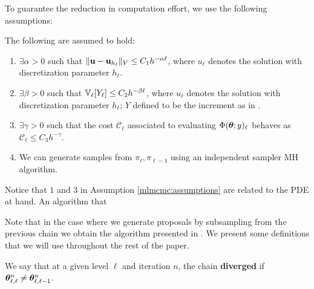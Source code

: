 To guarantee the reduction in computation effort, we use the following assumptions:
\begin{assumption}\label{mlmcmc:assumptions}The following are assumed to hold:
	\begin{enumerate}
		\item $\exists \alpha>0$ such that $\Vert \mathbf{u}-\mathbf{u}_{h_\ell}\Vert_V\leq C_1h^{-\alpha \ell}$, where $u_\ell$ denotes the solution with discretization parameter $h_\ell$.
		\item $\exists \beta>0$ such that $\mathbb{V}_\ell[ Y_\ell] \leq C_2h^{-\beta \ell}$, where $u_\ell$ denotes the solution with discretization parameter $h_\ell$; $Y$ defined to be the increment as in \cite{dodwell2015hierarchical}.
		\item $\exists \gamma>0$ such that the cost $\mathcal{C}_\ell$ associated to evaluating $\Phi(\bm{\theta};y)_\ell$ behaves as $\mathcal{C}_{\ell}\leq C_3h^{-\gamma}$.
		\item We can generate samples from $\pi_\ell, \pi_{\ell-1}$ using an independent sampler MH algorithm.
	\end{enumerate}
\end{assumption}
\begin{center}
	Notice that $1$ and $3$ in Assumption \ref{mlmcmc:assumptions} are related to the PDE at hand. An algorithm that 
\end{center}
Note that in the case where we generate proposals by subsampling from the previous chain we obtain the algorithm presented in \cite{dodwell2015hierarchical}. We present some definitions that we will use throughout the rest of the paper.
\begin{definition}
	We say that at a given level $\ell$ and iteration $n$, the chain \textbf{diverged} if $\bm{\theta}^n_{\ell,\ell}\neq \bm{\theta}^n_{\ell,\ell-1}$.
\end{definition}
